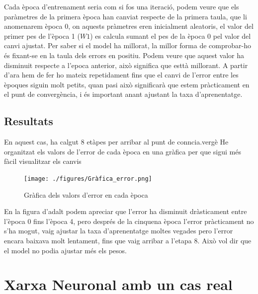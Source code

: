Cada època d'entrenament seria com si fos una iteració, podem veure que els paràmetres de la primera època han canviat respecte de la primera taula, que li anomenarem època 0, on aquests pràmetres eren inicialment aleatoris, el valor del primer pes de l'època 1 ($W1$) es calcula sumant el pes de la època 0 pel valor del canvi ajustat.
Per saber si el model ha millorat, la millor forma de comprobar-ho és fixant-se en la taula dels errors en positiu. Podem veure que aquest valor ha disminuit respecte a l'epoca anterior, això significa que esttà millorant.
A partir d'ara hem de fer ho mateix repetidament fins que el canvi de l'error entre les èpoques siguin molt petits, quan pasi això significarà que estem pràcticament en el punt de convergència, i és important anant ajustant la taxa d'aprenentatge.
\subsection{Resultats}
En aquest cas, ha calgut 8 etàpes per arribar al punt de conncia.vergè He organitzat els valors de l'error de cada època en una gràfica per que sigui més fàcil visualitzar els canvis


\begin{figure}[H]
    \centering
    \texttt{[image: ./figures/Gràfica\_error.png]}
    \caption{Gràfica dels valors d'error en cada època}
\end{figure}



En la figura d'adalt podem apreciar que l'error ha disminuit dràsticament entre l'època 0 fins l'època 4, pero després de la cinquena època l'error pràcticament no s'ha mogut, vaig ajustar la taxa d'aprenentatge moltes vegades pero l'error encara baixava molt lentament, fins que vaig arribar a l'etapa 8. Això vol dir que el model no podia ajustar més els pesos.


\section{Xarxa Neuronal amb un cas real}\label{sec:12}
